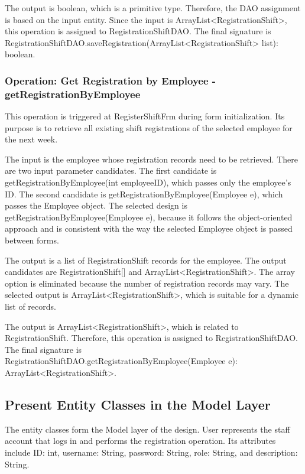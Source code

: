 The output is boolean, which is a primitive type. Therefore, the DAO assignment is based on the input entity. Since the input is ArrayList<RegistrationShift>, this operation is assigned to RegistrationShiftDAO. The final signature is RegistrationShiftDAO.saveRegistration(ArrayList<RegistrationShift> list): boolean.

\subsubsection{Operation: Get Registration by Employee - getRegistrationByEmployee}

This operation is triggered at RegisterShiftFrm during form initialization. Its purpose is to retrieve all existing shift registrations of the selected employee for the next week.

The input is the employee whose registration records need to be retrieved. There are two input parameter candidates. The first candidate is getRegistrationByEmployee(int employeeID), which passes only the employee's ID. The second candidate is getRegistrationByEmployee(Employee e), which passes the Employee object. The selected design is getRegistrationByEmployee(Employee e), because it follows the object-oriented approach and is consistent with the way the selected Employee object is passed between forms.

The output is a list of RegistrationShift records for the employee. The output candidates are RegistrationShift[] and ArrayList<RegistrationShift>. The array option is eliminated because the number of registration records may vary. The selected output is ArrayList<RegistrationShift>, which is suitable for a dynamic list of records.

The output is ArrayList<RegistrationShift>, which is related to RegistrationShift. Therefore, this operation is assigned to RegistrationShiftDAO. The final signature is RegistrationShiftDAO.getRegistrationByEmployee(Employee e): ArrayList<RegistrationShift>.

\subsection{Present Entity Classes in the Model Layer}

The entity classes form the Model layer of the design. User represents the staff account that logs in and performs the registration operation. Its attributes include ID: int, username: String, password: String, role: String, and description: String.

